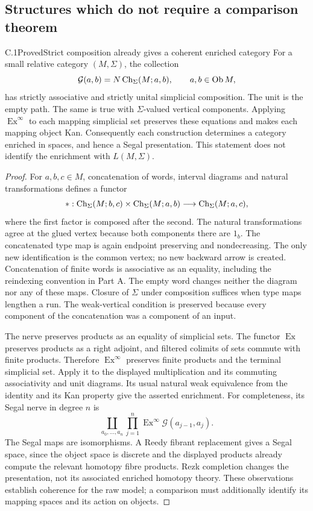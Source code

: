 \subsection{Structures which do not require a comparison theorem}

\begin{result}{C.1}{Proved}{Strict composition already gives a coherent enriched category}
For a small relative category $(M,\Sigma)$, the collection
\[
 \mathcal G(a,b)=N\operatorname{Ch}_\Sigma(M;a,b),\qquad a,b\in\operatorname{Ob}M,
\]
has strictly associative and strictly unital simplicial composition. The unit is the empty path. The same is true with $\Sigma$-valued vertical components. Applying $\operatorname{Ex}^{\infty}$ to each mapping simplicial set preserves these equations and makes each mapping object Kan. Consequently each construction determines a category enriched in spaces, and hence a Segal presentation. This statement does not identify the enrichment with $L(M,\Sigma)$.
\end{result}
\begin{proof}
For $a,b,c\in M$, concatenation of words, interval diagrams and natural transformations defines a functor
\[
 *:\operatorname{Ch}_\Sigma(M;b,c)\times\operatorname{Ch}_\Sigma(M;a,b)
       \longrightarrow\operatorname{Ch}_\Sigma(M;a,c),
\]
where the first factor is composed after the second. The natural transformations agree at the glued vertex because both components there are $1_b$. The concatenated type map is again endpoint preserving and nondecreasing. The only new identification is the common vertex; no new backward arrow is created. Concatenation of finite words is associative as an equality, including the reindexing convention in Part A. The empty word changes neither the diagram nor any of these maps. Closure of $\Sigma$ under composition suffices when type maps lengthen a run. The weak-vertical condition is preserved because every component of the concatenation was a component of an input.

The nerve preserves products as an equality of simplicial sets. The functor $\operatorname{Ex}$ preserves products as a right adjoint, and filtered colimits of sets commute with finite products. Therefore $\operatorname{Ex}^{\infty}$ preserves finite products and the terminal simplicial set. Apply it to the displayed multiplication and its commuting associativity and unit diagrams. Its usual natural weak equivalence from the identity and its Kan property give the asserted enrichment. For completeness, its Segal nerve in degree $n$ is
\[
 \coprod_{a_0,\ldots,a_n}\prod_{j=1}^{n}
 \operatorname{Ex}^{\infty}\mathcal G(a_{j-1},a_j).
\]
The Segal maps are isomorphisms. A Reedy fibrant replacement gives a Segal space, since the object space is discrete and the displayed products already compute the relevant homotopy fibre products. Rezk completion changes the presentation, not its associated enriched homotopy theory. These observations establish coherence for the raw model; a comparison must additionally identify its mapping spaces and its action on objects.
\end{proof}

